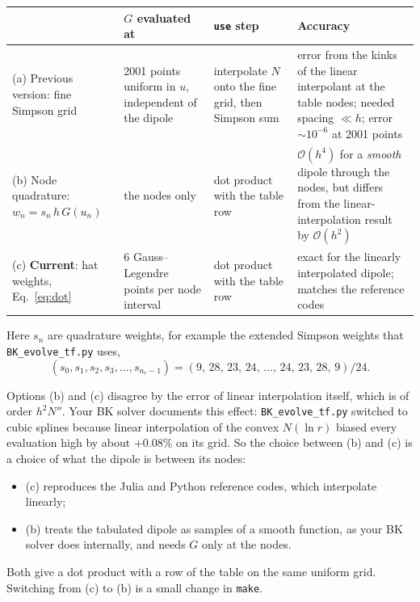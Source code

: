 \documentclass[11pt,a4paper]{article}
\newcommand{\code}[1]{\texttt{\small #1}}
\begin{document}
\begin{table}[H]
\centering\small
\renewcommand{\arraystretch}{1.35}
\begin{tabular}{@{}p{3.2cm} p{3.6cm} p{3.4cm} p{4.6cm}@{}}
\toprule
& $G$ evaluated at & \code{use} step & Accuracy\\
\midrule
(a) Previous version: fine Simpson grid & 2001 points uniform in $u$, independent of the dipole & interpolate $N$ onto the fine grid, then Simpson sum & error from the kinks of the linear interpolant at the table nodes; needed spacing $\ll h$; error $\sim10^{-6}$ at 2001 points\\
(b) Node quadrature: $w_n=s_n\,h\,G(u_n)$ & the nodes only & dot product with the table row & $\mathcal O(h^4)$ for a \emph{smooth} dipole through the nodes, but differs from the linear-interpolation result by $\mathcal O(h^2)$\\
(c) \textbf{Current}: hat weights, Eq.~\eqref{eq:dot} & 6 Gauss--Legendre points per node interval & dot product with the table row & exact for the linearly interpolated dipole; matches the reference codes\\
\bottomrule
\end{tabular}
\end{table}
Here $s_n$ are quadrature weights, for example the extended Simpson weights that \code{BK\_evolve\_tf.py} uses,
\[
(s_0,s_1,s_2,s_3,\dots,s_{n_r-1})=(9,\,28,\,23,\,24,\,\dots,\,24,\,23,\,28,\,9)/24 .
\]

Options (b) and (c) disagree by the error of linear interpolation itself, which is of order $h^2N''$. Your BK solver documents this effect: \code{BK\_evolve\_tf.py} switched to cubic splines because linear interpolation of the convex $N(\ln r)$ biased every evaluation high by about $+0.08\%$ on its grid. So the choice between (b) and (c) is a choice of what the dipole is between its nodes:
\begin{itemize}
\item (c) reproduces the Julia and Python reference codes, which interpolate linearly;
\item (b) treats the tabulated dipole as samples of a smooth function, as your BK solver does internally, and needs $G$ only at the nodes.
\end{itemize}
Both give a dot product with a row of the table on the same uniform grid. Switching from (c) to (b) is a small change in \code{make}.
\end{document}
